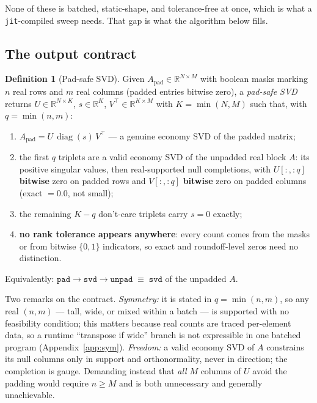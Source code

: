 \documentclass[11pt]{article}
\theoremstyle{definition}
\newtheorem{definition}[theorem]{Definition}
\theoremstyle{remark}
\newcommand{\R}{\mathbb{R}}
\newcommand{\Apad}{A_{\mathrm{pad}}}
\newcommand{\diag}{\operatorname{diag}}
\newcommand{\code}[1]{\texttt{#1}}
\begin{document}
None of these is batched, static-shape, and tolerance-free at once, which is what a \code{jit}-compiled
sweep needs. That gap is what the algorithm below fills.

\subsection{The output contract}\label{sec:contract}

\begin{definition}[Pad-safe SVD]\label{def:contract}
Given $\Apad\in\R^{N\times M}$ with boolean masks marking $n$ real rows and $m$ real columns
(padded entries bitwise zero), a \emph{pad-safe SVD} returns $U\in\R^{N\times K}$,
$s\in\R^{K}$, $V^{\top}\in\R^{K\times M}$ with $K=\min(N,M)$ such that, with $q=\min(n,m)$:
\begin{enumerate}[itemsep=1pt]
\item $\Apad = U\,\diag(s)\,V^{\top}$ --- a genuine economy SVD of the padded matrix;
\item the first $q$ triplets are a valid economy SVD of the unpadded real block $A$: its positive
singular values, then real-supported null completions, with $U[:,{:}q]$ \textbf{bitwise} zero on
padded rows and $V[:,{:}q]$ \textbf{bitwise} zero on padded columns (exact $=0.0$, not small);
\item the remaining $K-q$ don't-care triplets carry $s=0$ exactly;
\item \textbf{no rank tolerance appears anywhere}: every count comes from the masks or from
bitwise $\{0,1\}$ indicators, so exact and roundoff-level zeros need no distinction.
\end{enumerate}
Equivalently: $\code{pad}\to\code{svd}\to\code{unpad} \;\equiv\; \code{svd}$ of the unpadded $A$.
\end{definition}

Two remarks on the contract. \emph{Symmetry:} it is stated in $q=\min(n,m)$, so any real $(n,m)$
--- tall, wide, or mixed within a batch --- is supported with no feasibility condition; this
matters because real counts are traced per-element data, so a runtime ``transpose if wide'' branch
is not expressible in one batched program (Appendix~\ref{app:sym}). \emph{Freedom:} a valid
economy SVD of $A$ constrains its null columns only in support and orthonormality, never in
direction; the completion is gauge. Demanding instead that \emph{all} $M$ columns of $U$ avoid the
padding would require $n\ge M$ and is both unnecessary and generally unachievable.
\end{document}
